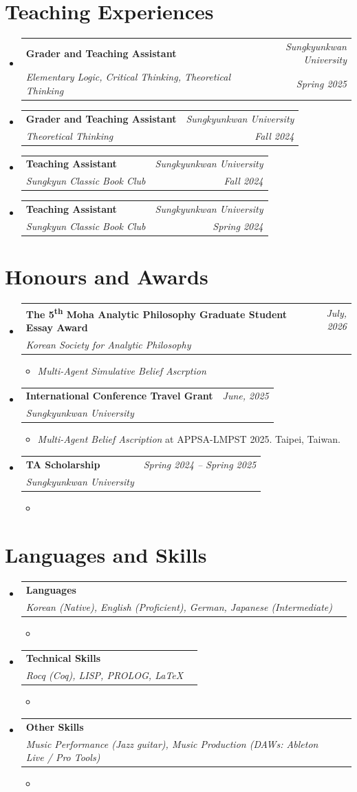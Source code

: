 \documentclass[a4paper,11pt]{article}
\makeatletter
\newcommand{\resumeSubheading}[4]{
\vspace{0.5mm}\item
    \begin{tabular*}{0.98\textwidth}[t]{l@{\extracolsep{\fill}}r}
        \textbf{#1} & \textit{\footnotesize{#4}} \\
        \textit{\footnotesize{#3}} &  \footnotesize{#2}\\
    \end{tabular*}
    \vspace{-2.4mm}
}
\newcommand{\resumeProject}[4]{
\vspace{0.5mm}\item
    \begin{tabular*}{0.98\textwidth}[t]{l@{\extracolsep{\fill}}r}
        \textbf{#1} & \textit{\footnotesize{#3}} \\
        \footnotesize{\textit{#2}} & \footnotesize{#4}
    \end{tabular*}
    \vspace{-2.4mm}
}
\newcommand{\resumeSubHeadingListStart}{\begin{itemize}[leftmargin=*,labelsep=1mm]}
\newcommand{\resumeItemListStart}{\begin{itemize}[leftmargin=*,labelsep=1mm,itemsep=0.5mm]}
\newcommand{\resumeSubHeadingListEnd}{\end{itemize}\vspace{2mm}}
\newcommand{\resumeItemListEnd}{\end{itemize}\vspace{-2mm}}
\makeatother
\begin{document}
\section{\textbf{Teaching Experiences}}
\vspace{-0.4mm}
\resumeSubHeadingListStart

\resumeSubheading
{Grader and Teaching Assistant}{\textit{Spring 2025}}
{Elementary Logic, Critical Thinking, Theoretical Thinking}{Sungkyunkwan University}

\resumeSubheading
{Grader and Teaching Assistant}{\textit{Fall 2024}}
{Theoretical Thinking}{Sungkyunkwan University}

\resumeSubheading
{Teaching Assistant}{\textit{Fall 2024}}
{Sungkyun Classic Book Club}{Sungkyunkwan University}

\resumeSubheading
{Teaching Assistant}{\textit{Spring 2024}}
{Sungkyun Classic Book Club}{Sungkyunkwan University}

\resumeSubHeadingListEnd
\vspace{-4mm}

\section{\textbf{Honours and Awards}}
\vspace{-0.4mm}
\resumeSubHeadingListStart
\resumeProject{The 5\textsuperscript{th} Moha Analytic Philosophy Graduate Student Essay Award}
{Korean Society for Analytic Philosophy}{July, 2026}
{{}}
\resumeItemListStart
\item \footnotesize \textit{Multi-Agent Simulative Belief Ascrption}
\resumeItemListEnd
\resumeProject
{International Conference Travel Grant}
{Sungkyunkwan University}
{June, 2025}
{{}}
\resumeItemListStart
 \item \footnotesize \textit{Multi-Agent Belief Ascription} at APPSA-LMPST 2025. Taipei, Taiwan.
\resumeItemListEnd
\resumeProject
{TA Scholarship}
{Sungkyunkwan University}
{Spring 2024 -- Spring 2025}
{{}}
\resumeItemListStart
 \item[]
\resumeItemListEnd
\resumeSubHeadingListEnd
\vspace{-8mm}

\section{\textbf{Languages and Skills}}
\vspace{0.4mm}
\resumeSubHeadingListStart
\resumeSubheading
{Languages}{}
{Korean (Native), English (Proficient), German, Japanese (Intermediate)}{}
\resumeItemListStart
\item[]
\resumeItemListEnd
\vspace{-4mm}
\resumeSubheading
{Technical Skills}{}
{Rocq (Coq), LISP, PROLOG, \LaTeX}{}
\resumeItemListStart
\item[]
\resumeItemListEnd
\vspace{-4mm}
\resumeSubheading
{Other Skills}{}
{Music Performance (Jazz guitar), Music Production (DAWs: Ableton Live / Pro Tools)}{}
\resumeItemListStart
\item[]
\resumeItemListEnd
\resumeSubHeadingListEnd
\vspace{-8mm}
\end{document}

